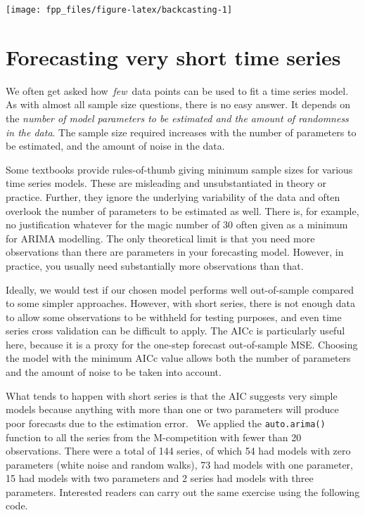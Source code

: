 \documentclass[]{book}
\begin{document}
\begin{center}\texttt{[image: fpp\_files/figure-latex/backcasting-1]} \end{center}

\hypertarget{short-ts}{%
\section{Forecasting very short time series}\label{short-ts}}

We often get asked how~\emph{few}~data points can be used to fit a time series model. As with almost all sample size questions, there is no easy answer. It depends on the \emph{number of model parameters to be estimated and the amount of randomness in the data}. The sample size required increases with the number of parameters to be estimated, and the amount of noise in the data.

Some textbooks provide rules-of-thumb giving minimum sample sizes for various time series models. These are misleading and unsubstantiated in theory or practice. Further, they ignore the underlying variability of the data and often overlook the number of parameters to be estimated as well. There is, for example, no justification whatever for the magic number of 30 often given as a minimum for ARIMA modelling. The only theoretical limit is that you need more observations than there are parameters in your forecasting model. However, in practice, you usually need substantially more observations than that.

Ideally, we would test if our chosen model performs well out-of-sample compared to some simpler approaches. However, with short series, there is not enough data to allow some observations to be withheld for testing purposes, and even time series cross validation can be difficult to apply. The AICc is particularly useful here, because it is a proxy for the one-step forecast out-of-sample MSE. Choosing the model with the minimum AICc value allows both the number of parameters and the amount of noise to be taken into account.

What tends to happen with short series is that the AIC suggests very simple models because anything with more than one or two parameters will produce poor forecasts due to the estimation error. ~We applied the \texttt{auto.arima()} function to all the series from the M-competition with fewer than 20 observations. There were a total of 144 series, of which 54 had models with zero parameters (white noise and random walks), 73 had models with one parameter, 15 had models with two parameters and 2 series had models with three parameters. Interested readers can carry out the same exercise using the following code.
\end{document}
